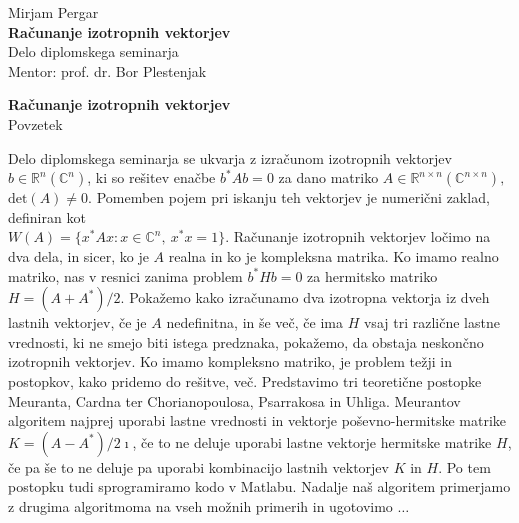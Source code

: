 \documentclass[12pt,a4paper]{amsart}
\theoremstyle{definition}
\theoremstyle{plain}
\newcommand{\R}{\mathbb R}
\newcommand{\C}{\mathbb C}
\begin{document}
\thispagestyle{empty}
\vfill

\begin{center}{\large
Mirjam Pergar\\[2mm]
{\bf Računanje izotropnih vektorjev}\\[10mm]
Delo diplomskega seminarja\\[1cm]
Mentor: prof. dr. Bor Plestenjak}
\end{center}
\vfill

\pagebreak

\thispagestyle{empty}
\tableofcontents
\pagebreak

\thispagestyle{empty}
\begin{center}
{\bf Računanje izotropnih vektorjev}\\[3mm]
{\sc Povzetek}
\end{center}
Delo diplomskega seminarja se ukvarja z izračunom izotropnih vektorjev $b\in\R^{n} (\C^{n})$, ki so rešitev enačbe $b^\ast Ab=0$ za dano matriko $A\in\R^{n\times n} (\C^{n\times n}),$ $\text{det}(A)\ne 0$.
Pomemben pojem pri iskanju teh vektorjev je numerični zaklad, definiran kot\\ $W(A)=\{x^\ast Ax\! : x \in \C^n,\ x^\ast x=1\}.$ %
Računanje izotropnih vektorjev ločimo na dva dela, in sicer, ko je $A$ realna in ko je kompleksna matrika.
Ko imamo realno matriko, nas v resnici zanima problem $b^\ast Hb=0$ za hermitsko matriko $H=(A+A^\ast)/2$. 
Pokažemo kako izračunamo dva izotropna vektorja iz dveh lastnih vektorjev, če je $A$ nedefinitna, in še več, če ima $H$ vsaj tri različne lastne vrednosti, ki ne smejo biti istega predznaka, pokažemo, da obstaja neskončno izotropnih vektorjev.
Ko imamo kompleksno matriko, je problem težji in postopkov, kako pridemo do rešitve, več. Predstavimo tri teoretične postopke Meuranta, Cardna ter Chorianopoulosa, Psarrakosa in Uhliga.
Meurantov algoritem najprej uporabi lastne vrednosti in vektorje poševno-hermitske matrike $K=(A-A^\ast)/2\imath$, če to ne deluje uporabi lastne vektorje hermitske matrike $H$, če pa še to ne deluje pa uporabi kombinacijo lastnih vektorjev $K$ in $H$.
Po tem postopku tudi sprogramiramo kodo v Matlabu.
Nadalje naš algoritem primerjamo z drugima algoritmoma na vseh možnih primerih in ugotovimo $\dots$
\end{document}
